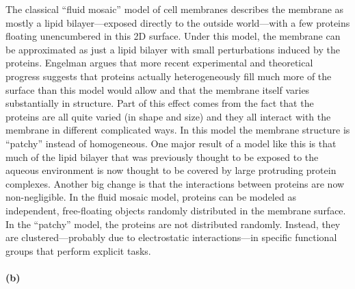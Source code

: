 \documentclass[12pt]{article}
\begin{document}
The classical ``fluid mosaic'' model of cell membranes \cite{fluid} describes
the membrane as mostly a lipid bilayer---exposed directly to the outside
world---with a few proteins floating unencumbered in this 2D surface.
Under this model, the membrane can be approximated as just a lipid bilayer
with small perturbations induced by the proteins.
Engelman \cite{membranes} argues that more recent experimental and theoretical
progress suggests that proteins actually heterogeneously fill much more of the
surface than this model would allow and that the membrane itself varies
substantially in structure.
Part of this effect comes from the fact that the proteins are all quite
varied (in shape and size) and they all interact with the membrane in
different complicated ways.
In this model the membrane structure is ``patchy'' instead of homogeneous.
One major result of a model like this is that much of the lipid bilayer that
was previously thought to be exposed to the aqueous environment is now thought
to be covered by large protruding protein complexes.
Another big change is that the interactions between proteins are now
non-negligible.
In the fluid mosaic model, proteins can be modeled as independent,
free-floating objects randomly distributed in the membrane surface.
In the ``patchy'' model, the proteins are not distributed randomly.
Instead, they are clustered---probably due to electrostatic interactions---in
specific functional groups that perform explicit tasks.

\paragraph{(b)}
\end{document}
